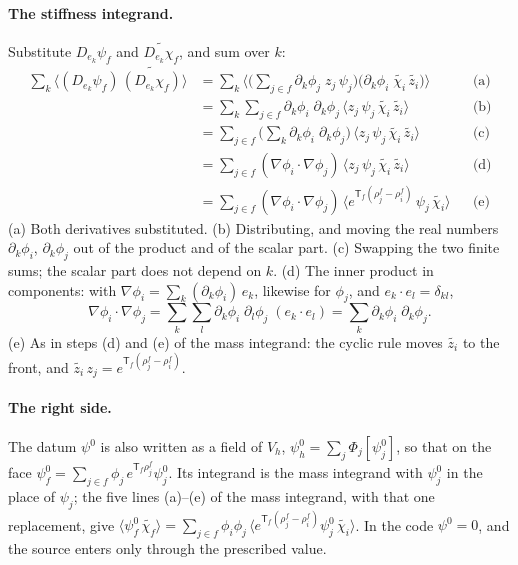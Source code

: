 \paragraph{The stiffness integrand.} Substitute $D_{e_k}\psi_f$ and $\widetilde{D_{e_k}\chi_f}$, and sum over $k$:
\begin{align*}
\sum_k \big\langle (D_{e_k} \psi_f)\, \widetilde{(D_{e_k}\chi_f)} \big\rangle
&= \sum_k \Big\langle\Big(\sum_{j\in f}\partial_k\phi_j\; z_j\,\psi_j\Big)\Big(\partial_k\phi_i\;\widetilde{\chi_i}\,\widetilde{z_i}\Big)\Big\rangle && \text{(a)} \\
&= \sum_k\sum_{j\in f}\partial_k\phi_i\;\partial_k\phi_j\, \big\langle z_j\,\psi_j\,\widetilde{\chi_i}\,\widetilde{z_i} \big\rangle && \text{(b)} \\
&= \sum_{j\in f}\Big(\sum_k \partial_k\phi_i\;\partial_k\phi_j\Big)\, \big\langle z_j\,\psi_j\,\widetilde{\chi_i}\,\widetilde{z_i} \big\rangle && \text{(c)} \\
&= \sum_{j\in f}(\nabla\phi_i \cdot \nabla\phi_j)\, \big\langle z_j\,\psi_j\,\widetilde{\chi_i}\,\widetilde{z_i} \big\rangle && \text{(d)} \\
&= \sum_{j\in f}(\nabla\phi_i \cdot \nabla\phi_j)\, \big\langle e^{\mathsf T_f (\rho_j^f - \rho_i^f)}\, \psi_j\, \widetilde{\chi_i} \big\rangle && \text{(e)}
\end{align*}
(a) Both derivatives substituted. (b) Distributing, and moving the real numbers $\partial_k\phi_i$, $\partial_k\phi_j$ out of the product and of the scalar part. (c) Swapping the two finite sums; the scalar part does not depend on $k$. (d) The inner product in components: with $\nabla\phi_i = \sum_k (\partial_k\phi_i)\, e_k$, likewise for $\phi_j$, and $e_k\cdot e_l = \delta_{kl}$,
\begin{equation*}
\nabla\phi_i\cdot\nabla\phi_j = \sum_k\sum_l \partial_k\phi_i\;\partial_l\phi_j\;(e_k\cdot e_l) = \sum_k \partial_k\phi_i\;\partial_k\phi_j .
\end{equation*}
(e) As in steps (d) and (e) of the mass integrand: the cyclic rule moves $\widetilde{z_i}$ to the front, and $\widetilde{z_i}\,z_j = e^{\mathsf T_f(\rho_j^f - \rho_i^f)}$.

\paragraph{The right side.} The datum $\psi^0$ is also written as a field of $V_h$, $\psi^0_h = \sum_j\Phi_j[\psi^0_j]$, so that on the face $\psi^0_f = \sum_{j\in f}\phi_j\, e^{\mathsf T_f\rho_j^f}\psi^0_j$. Its integrand is the mass integrand with $\psi^0_j$ in the place of $\psi_j$; the five lines (a)--(e) of the mass integrand, with that one replacement, give $\langle\psi^0_f\,\widetilde{\chi_f}\rangle = \sum_{j\in f}\phi_i\phi_j\,\langle e^{\mathsf T_f(\rho_j^f - \rho_i^f)}\psi^0_j\,\widetilde{\chi_i}\rangle$. In the code $\psi^0 = 0$, and the source enters only through the prescribed value.


